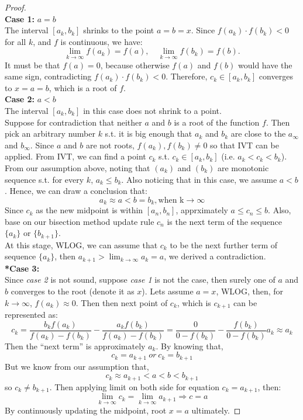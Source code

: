 \documentclass{article}
\begin{document}
\begin{proof}
    \\
    \textbf{Case 1:} \( a = b \)
    \\
    The interval \( [a_k, b_k] \) shrinks to the point \( a = b = x \).
    Since \( f(a_k) \cdot f(b_k) < 0 \) for all \( k \), and \( f \) is continuous, we have:
    \[
        \lim_{k \to \infty} f(a_k) = f(a), \quad \lim_{k \to \infty} f(b_k) = f(b).
    \]
    It must be that \( f(a) = 0 \), because otherwise \( f(a) \) and \( f(b) \) would have the same sign, contradicting \( f(a_k) \cdot f(b_k) < 0 \).
    Therefore, \( c_k \in [a_k, b_k] \) converges to \( x = a = b \), which is a root of \( f \).
    \\
    \textbf{Case 2:} \( a < b \)
    \\
    The interval \( [a_k, b_k] \) in this case does not shrink to a point.
    \\
    Suppose for contradiction that neither $a$ and $b$ is a root of the function $f$. Then pick an arbitrary number $k$ s.t. it is big enough that $a_k$ and $b_k$ 
    are close to the $a_{\infty}$ and $b_{\infty}$. 
    Since $a$ and $b$ are not roots, $f(a_k), f(b_k) \neq 0$ so that IVT can be applied.
    From IVT, we can find a point $c_k$ s.t. $c_k \in [a_k, b_k]$ (i.e. $a_k < c_k < b_k$). 
    From our assumption above, noting that $(a_k)$ and $(b_k)$ are monotonic sequence s.t. for every $k$, $a_k \leq b_k$. Also noticing that in this case, we assume $a < b$.
    Hence, we can draw a conclusion that:
    \[ a_k \approx a < b = b_k, \text{when k} \to \infty \]
    Since $c_k$ as the new midpoint is within $[a_n, b_n]$, apprximately $a \leq c_n \leq b$. Also, base on our bisection method update rule $c_n$ is the next term of the sequence $\{a_{k}\}$ or $\{b_{k+1}\}$.
    \\
    At this stage, WLOG, we can assume that $c_k$ to be the next further term of sequence $\{a_{k}\}$, then $a_{k + 1} > \lim_{k \to \infty} a_k = a$, we derived a contradiction.
    \\
    \textbf{*Case 3:} 
    \\
    Since \textit{case 2} is not sound, suppose \textit{case 1} is not the case, then surely one of $a$ and $b$ converges to the root (denote it as $x$).
    Lets assume $a = x$, WLOG, then, for $k \to \infty$, $f(a_k) \approx 0$. Then then next point of $c_k$, which is $c_{k + 1}$ can be represented as:
    \[ c_{k} = \frac{b_k f(a_k) }{f(a_k) - f(b_k)} - \frac{a_k f(b_k)}{f(a_k) - f(b_k)} = \frac{0}{0 - f(b_k)} - \frac{f(b_k)}{0 - f(b_k)} a_k \approx a_k \]
    Then the ``next term'' is approximately $a_k$. By knowing that,
    \[ c_k = a_{k + 1} \ or \ c_k = b_{k+1} \]
    But we know from our assumption that,
    \[ c_k \approx a_{k + 1} < a < b < b_{k + 1} \]
    so $c_k \neq b_{k+1}$. Then applying limit on both side for equation $c_k = a_{k + 1}$, then:
    \[ \lim_{k \to \infty} c_k = \lim_{k \to \infty} a_{k + 1} \Rightarrow c = a \]
    By continuously updating the midpoint, root $x = a$ ultimately.
\end{proof}
\end{document}
